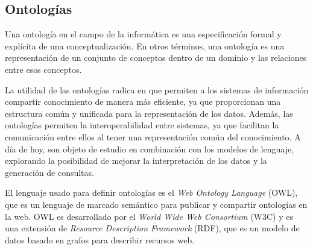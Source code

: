 \subsection{Ontologías}
Una ontología en el campo de la informática es una especificación formal y explícita de una conceptualización. En otros términos, una ontología es una representación de un conjunto de conceptos dentro de un dominio y las relaciones entre esos conceptos. 

La utilidad de las ontologías radica en que permiten a los sistemas de información compartir conocimiento de manera más eficiente, ya que proporcionan una estructura común y unificada para la representación de los datos. Además, las ontologías permiten la interoperabilidad entre sistemas, ya que facilitan la comunicación entre ellos al tener una representación común del conocimiento. A día de hoy, son objeto de estudio en combinación con los modelos de lenguaje, explorando la posibilidad de mejorar la interpretación de los datos y la generación de consultas.

El lenguaje usado para definir ontologías es el \textit{Web Ontology Language} (OWL), que es un lenguaje de marcado semántico para publicar y compartir ontologías en la web. OWL es desarrollado por el \textit{World Wide Web Consortium} (W3C) y es una extensión de \textit{Resource Description Framework} (RDF), que es un modelo de datos basado en grafos para describir recursos web.

